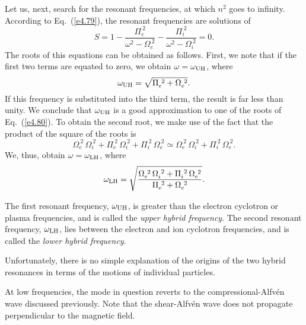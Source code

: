 Let us, next, search for the resonant frequencies, at which $n^2$ goes to
infinity. According to Eq.~(\ref{e4.79}),  the
resonant frequencies are solutions of
\begin{equation}\label{e4.80}
S = 1- \frac{{\Pi}_e^{~2}}{\omega^2-{\Omega}_e^{~2}}
- \frac{{\Pi}_i^{~2}}{\omega^2-{\Omega}_i^{~2}}=0.
\end{equation}
The roots of this equations can be obtained as follows. First, we note that
if the first two terms are equated to zero, we obtain $\omega=\omega_{\rm UH}$,
where
\begin{equation}
\omega_{\rm UH} = \sqrt{{\Pi}_e^{~2} + {\Omega}_e^{~2}}.
\end{equation}
If this frequency  is substituted into the third term, the result is
far less than unity. We conclude that $\omega_{\rm UH}$ is a good approximation
to one of the roots of Eq.~(\ref{e4.80}). To
obtain the second root, we make use of the fact that the product of the square
of the roots
is 
\begin{equation}
{\Omega}_e^{~2}\,{\Omega}_i^{~2} + {\Pi}_e^{~2}\,{\Omega}_i^{~2}
+ {\Pi}_i^{~2}\,{\Omega}_e^{~2}\simeq 
{\Omega}_e^{~2}\,{\Omega}_i^{~2}+ {\Pi}_i^{~2}\,{\Omega}_e^{~2}.
\end{equation}
We, thus, obtain $\omega= \omega_{\rm LH}$, where
\begin{equation}
\omega_{\rm LH} = \sqrt{\frac{ {\Omega}_e^{~2}\,{\Omega}_i^{~2}+ {\Pi}_i^{~2}\,{\Omega}_e^{~2} } { {\Pi}_e^{~2} + {\Omega}_e^{~2} }}.
\end{equation}

The first resonant frequency, $\omega_{\rm UH}$, is greater than the
electron cyclotron or plasma frequencies, and is called the {\em upper hybrid
frequency}. The second resonant frequency, $\omega_{\rm LH}$, lies between the
electron and ion cyclotron frequencies, and is called the 
{\em lower hybrid frequency}. 

Unfortunately, there is no simple explanation of the origins of the
two hybrid resonances in terms of the motions of individual particles. 

At low frequencies, the mode in question 
 reverts to the compressional-Alfv\'{e}n wave
discussed previously. Note that the shear-Alfv\'{e}n wave does not
propagate perpendicular to the magnetic field. 



